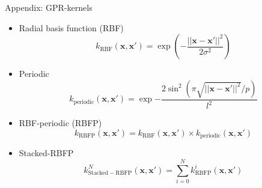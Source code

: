 
\begin{frame}{Appendix: GPR-kernels}

  \begin{itemize}
    \itemsep 1em
    \item Radial basis function (RBF)
    \[ k_\mathrm{RBF}(\mathbf{x}, \mathbf{x}') = \exp{\left(-\frac{||\mathbf{x}-\mathbf{x}'||^2}{2\sigma^2}\right)} \]
    \item Periodic
    \[ k_\mathrm{periodic}(\mathbf{x}, \mathbf{x}') = \exp{-\frac{2 \sin^2{\left(\pi \sqrt{||\mathbf{x}-\mathbf{x}'||^2} / p\right)}}{l^2}} \]
    \item RBF-periodic (RBFP)
    \[ k_\mathrm{RBFP}(\mathbf{x}, \mathbf{x}') = k_\mathrm{RBF}(\mathbf{x}, \mathbf{x}') \times k_\mathrm{periodic}(\mathbf{x}, \mathbf{x}') \]
    \item Stacked-RBFP
    \[ k^N_\mathrm{Stacked-RBFP}(\mathbf{x}, \mathbf{x}') = \sum_{i=0}^{N} {k_\mathrm{RBFP}^i(\mathbf{x}, \mathbf{x}')} \]
  \end{itemize}
  
\end{frame}